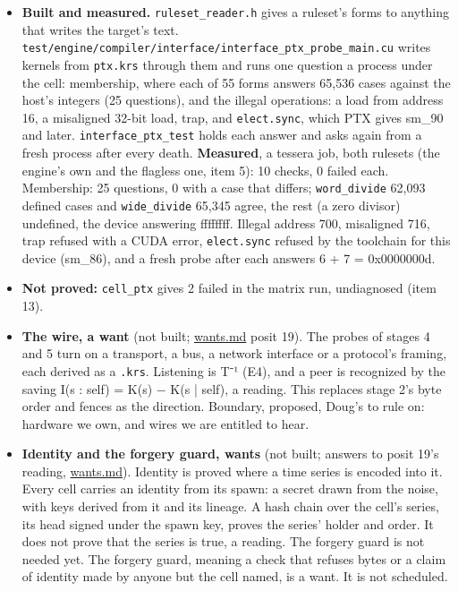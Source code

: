 \begin{enumerate}
\begin{itemize}
\begin{enumerate}
\begin{itemize}
\item \textbf{Built and measured.} \texttt{ruleset\_\allowbreak{}reader.\allowbreak{}h} gives a ruleset's forms to anything that writes the target's text. \texttt{test/\allowbreak{}engine/\allowbreak{}compiler/\allowbreak{}interface/\allowbreak{}interface\_\allowbreak{}ptx\_\allowbreak{}probe\_\allowbreak{}main.\allowbreak{}cu} writes kernels from \texttt{ptx.\allowbreak{}krs} through them and runs one question a process under the cell: membership, where each of 55 forms answers 65,536 cases against the host's integers (25 questions), and the illegal operations: a load from address 16, a misaligned 32-bit load, trap, and \texttt{elect.\allowbreak{}sync}, which PTX gives sm\_\allowbreak{}90 and later. \texttt{interface\_\allowbreak{}ptx\_\allowbreak{}test} holds each answer and asks again from a fresh process after every death. \textbf{Measured}, a tessera job, both rulesets (the engine's own and the flagless one, item 5): 10 checks, 0 failed each. Membership: 25 questions, 0 with a case that differs; \texttt{word\_\allowbreak{}divide} 62,093 defined cases and \texttt{wide\_\allowbreak{}divide} 65,345 agree, the rest (a zero divisor) undefined, the device answering ffffffff. Illegal address 700, misaligned 716, trap refused with a CUDA error, \texttt{elect.\allowbreak{}sync} refused by the toolchain for this device (sm\_\allowbreak{}86), and a fresh probe after each answers 6 + 7 = 0x0000000d.
\item \textbf{Not proved:} \texttt{cell\_\allowbreak{}ptx} gives 2 failed in the matrix run, undiagnosed (item 13).
\item \textbf{The wire, a want} (not built; \hyperref[chap:wants]{wants.md} posit 19). The probes of stages 4 and 5 turn on a transport, a bus, a network interface or a protocol's framing, each derived as a \texttt{.\allowbreak{}krs}. Listening is T⁻¹ (E4), and a peer is recognized by the saving I(s : self) = K(s) − K(s | self), a reading. This replaces stage 2's byte order and fences as the direction. Boundary, proposed, Doug's to rule on: hardware we own, and wires we are entitled to hear.
\item \textbf{Identity and the forgery guard, wants} (not built; answers to posit 19's reading, \hyperref[chap:wants]{wants.md}). Identity is proved where a time series is encoded into it. Every cell carries an identity from its spawn: a secret drawn from the noise, with keys derived from it and its lineage. A hash chain over the cell's series, its head signed under the spawn key, proves the series' holder and order. It does not prove that the series is true, a reading. The forgery guard is not needed yet. The forgery guard, meaning a check that refuses bytes or a claim of identity made by anyone but the cell named, is a want. It is not scheduled.

\end{itemize}
\end{enumerate}
\end{itemize}
\end{enumerate}
